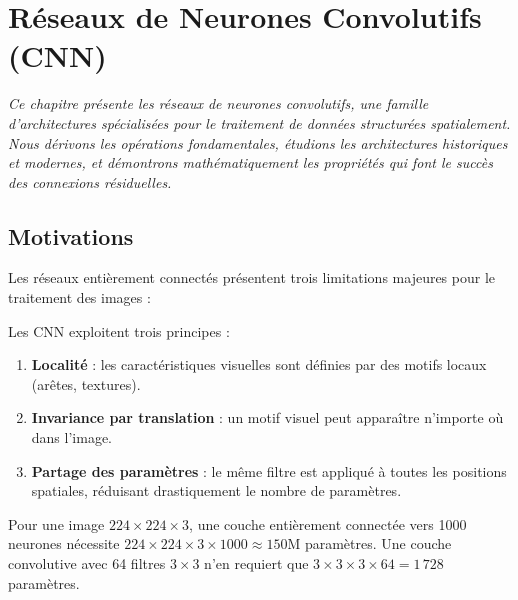 \chapter{R\'eseaux de Neurones Convolutifs (CNN)}
\label{ch:cnn}

\noindent\textit{Ce chapitre pr\'esente les r\'eseaux de neurones convolutifs, une famille
d'architectures sp\'ecialis\'ees pour le traitement de donn\'ees structur\'ees
spatialement. Nous d\'erivons les op\'erations fondamentales, \'etudions les
architectures historiques et modernes, et d\'emontrons math\'ematiquement les
propri\'et\'es qui font le succ\`es des connexions r\'esiduelles.}\medskip

\section{Motivations}
\label{sec:cnn-motivations}

Les r\'eseaux enti\`erement connect\'es pr\'esentent trois limitations
majeures pour le traitement des images :

\begin{definition}
Les CNN exploitent trois principes :
\begin{enumerate}
  \item \textbf{Localit\'e} : les caract\'eristiques visuelles sont d\'efinies
    par des motifs locaux (ar\^etes, textures).
  \item \textbf{Invariance par translation} : un motif visuel peut appara\^itre
    n'importe o\`u dans l'image.
  \item \textbf{Partage des param\`etres} : le m\^eme filtre est appliqu\'e
    \`a toutes les positions spatiales, r\'eduisant drastiquement le nombre de
    param\`etres.
\end{enumerate}
\end{definition}

\begin{remarque}
Pour une image $224 \times 224 \times 3$, une couche enti\`erement connect\'ee
vers 1000 neurones n\'ecessite $224 \times 224 \times 3 \times 1000 \approx 150$M
param\`etres. Une couche convolutive avec 64 filtres $3 \times 3$ n'en
requiert que $3 \times 3 \times 3 \times 64 = 1\,728$ param\`etres.
\end{remarque}

